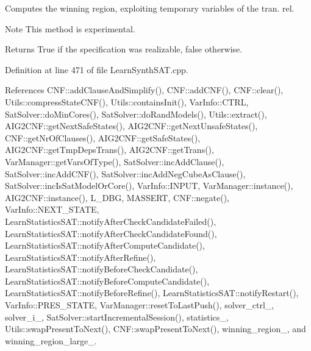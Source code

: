 Computes the winning region, exploiting temporary variables of the tran. rel. 

\begin{DoxyNote}{Note}
This method is experimental. 
\end{DoxyNote}
\begin{DoxyReturn}{Returns}
True if the specification was realizable, false otherwise. 
\end{DoxyReturn}


Definition at line 471 of file Learn\-Synth\-S\-A\-T.\-cpp.



References C\-N\-F\-::add\-Clause\-And\-Simplify(), C\-N\-F\-::add\-C\-N\-F(), C\-N\-F\-::clear(), Utils\-::compress\-State\-C\-N\-F(), Utils\-::contains\-Init(), Var\-Info\-::\-C\-T\-R\-L, Sat\-Solver\-::do\-Min\-Cores(), Sat\-Solver\-::do\-Rand\-Models(), Utils\-::extract(), A\-I\-G2\-C\-N\-F\-::get\-Next\-Safe\-States(), A\-I\-G2\-C\-N\-F\-::get\-Next\-Unsafe\-States(), C\-N\-F\-::get\-Nr\-Of\-Clauses(), A\-I\-G2\-C\-N\-F\-::get\-Safe\-States(), A\-I\-G2\-C\-N\-F\-::get\-Tmp\-Deps\-Trans(), A\-I\-G2\-C\-N\-F\-::get\-Trans(), Var\-Manager\-::get\-Vars\-Of\-Type(), Sat\-Solver\-::inc\-Add\-Clause(), Sat\-Solver\-::inc\-Add\-C\-N\-F(), Sat\-Solver\-::inc\-Add\-Neg\-Cube\-As\-Clause(), Sat\-Solver\-::inc\-Is\-Sat\-Model\-Or\-Core(), Var\-Info\-::\-I\-N\-P\-U\-T, Var\-Manager\-::instance(), A\-I\-G2\-C\-N\-F\-::instance(), L\-\_\-\-D\-B\-G, M\-A\-S\-S\-E\-R\-T, C\-N\-F\-::negate(), Var\-Info\-::\-N\-E\-X\-T\-\_\-\-S\-T\-A\-T\-E, Learn\-Statistics\-S\-A\-T\-::notify\-After\-Check\-Candidate\-Failed(), Learn\-Statistics\-S\-A\-T\-::notify\-After\-Check\-Candidate\-Found(), Learn\-Statistics\-S\-A\-T\-::notify\-After\-Compute\-Candidate(), Learn\-Statistics\-S\-A\-T\-::notify\-After\-Refine(), Learn\-Statistics\-S\-A\-T\-::notify\-Before\-Check\-Candidate(), Learn\-Statistics\-S\-A\-T\-::notify\-Before\-Compute\-Candidate(), Learn\-Statistics\-S\-A\-T\-::notify\-Before\-Refine(), Learn\-Statistics\-S\-A\-T\-::notify\-Restart(), Var\-Info\-::\-P\-R\-E\-S\-\_\-\-S\-T\-A\-T\-E, Var\-Manager\-::reset\-To\-Last\-Push(), solver\-\_\-ctrl\-\_\-, solver\-\_\-i\-\_\-, Sat\-Solver\-::start\-Incremental\-Session(), statistics\-\_\-, Utils\-::swap\-Present\-To\-Next(), C\-N\-F\-::swap\-Present\-To\-Next(), winning\-\_\-region\-\_\-, and winning\-\_\-region\-\_\-large\-\_\-.

